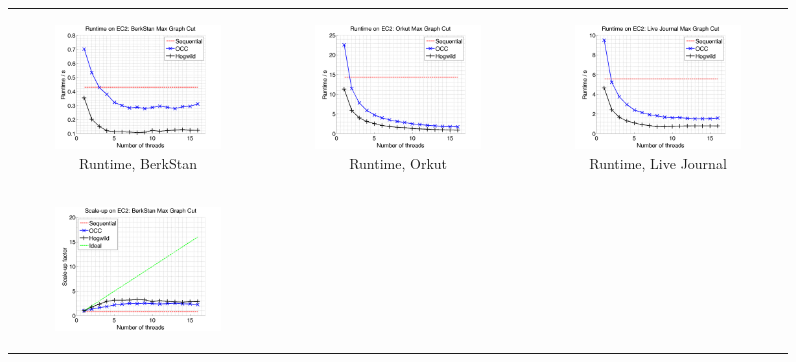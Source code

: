 \documentclass{article} %
\begin{document}
\begin{figure}[ht]
  \centering
  \begin{tabular}{ccc}
	  \begin{subfigure}[b]{0.31\textwidth}
	  	\includegraphics[width=150pt]{images/runtime_webberkstan_maxgraphcut.png}
			\caption{Runtime, BerkStan}
			\label{fig:runtime_webberkstan_maxgraphcut}
	  \end{subfigure} &
	  \begin{subfigure}[b]{0.31\textwidth}
	  	\includegraphics[width=150pt]{images/runtime_orkut_maxgraphcut.png}
			\caption{Runtime, Orkut}
			\label{fig:runtime_orkut_maxgraphcut}
	  \end{subfigure} &
	  \begin{subfigure}[b]{0.31\textwidth}
	  	\includegraphics[width=150pt]{images/runtime_livejournal_maxgraphcut.png}
			\caption{Runtime, Live Journal}
			\label{fig:runtime_livejournal_maxgraphcut}
	  \end{subfigure} \\
	  \begin{subfigure}[b]{0.31\textwidth}
	  	\includegraphics[width=150pt]{images/scaleup_webberkstan_maxgraphcut.png}

\end{subfigure}
\end{tabular}
\end{figure}
\end{document}
